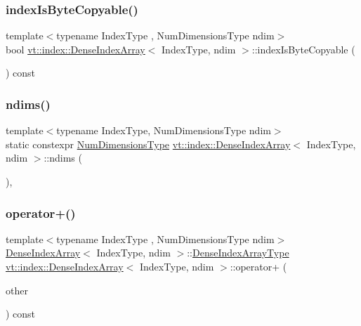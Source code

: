 \subsubsection{\texorpdfstring{index\+Is\+Byte\+Copyable()}{indexIsByteCopyable()}}
{\footnotesize\ttfamily template$<$typename Index\+Type , Num\+Dimensions\+Type ndim$>$ \\
bool \hyperlink{structvt_1_1index_1_1_dense_index_array}{vt\+::index\+::\+Dense\+Index\+Array}$<$ Index\+Type, ndim $>$\+::index\+Is\+Byte\+Copyable (\begin{DoxyParamCaption}{ }\end{DoxyParamCaption}) const}

\mbox{\label{structvt_1_1index_1_1_dense_index_array_a7a9a9e350279381589bfe1c75526c12a}} 
\subsubsection{\texorpdfstring{ndims()}{ndims()}}
{\footnotesize\ttfamily template$<$typename Index\+Type, Num\+Dimensions\+Type ndim$>$ \\
static constexpr \hyperlink{namespacevt_1_1index_a97aa9370711425850c86bcb7a20d73e8}{Num\+Dimensions\+Type} \hyperlink{structvt_1_1index_1_1_dense_index_array}{vt\+::index\+::\+Dense\+Index\+Array}$<$ Index\+Type, ndim $>$\+::ndims (\begin{DoxyParamCaption}{ }\end{DoxyParamCaption})\hspace{0.3cm}{\ttfamily [inline]}, {\ttfamily [static]}}

\mbox{\label{structvt_1_1index_1_1_dense_index_array_a2f63f2603e58cf017c07f11f9e233409}} 
\subsubsection{\texorpdfstring{operator+()}{operator+()}}
{\footnotesize\ttfamily template$<$typename Index\+Type , Num\+Dimensions\+Type ndim$>$ \\
\hyperlink{structvt_1_1index_1_1_dense_index_array}{Dense\+Index\+Array}$<$ Index\+Type, ndim $>$\+::\hyperlink{structvt_1_1index_1_1_dense_index_array_aec95c4ed1b4071d31d24142f02429dbd}{Dense\+Index\+Array\+Type} \hyperlink{structvt_1_1index_1_1_dense_index_array}{vt\+::index\+::\+Dense\+Index\+Array}$<$ Index\+Type, ndim $>$\+::operator+ (\begin{DoxyParamCaption}\item[{\hyperlink{structvt_1_1index_1_1_dense_index_array_aec95c4ed1b4071d31d24142f02429dbd}{Dense\+Index\+Array\+Type} const \&}]{other }\end{DoxyParamCaption}) const}

